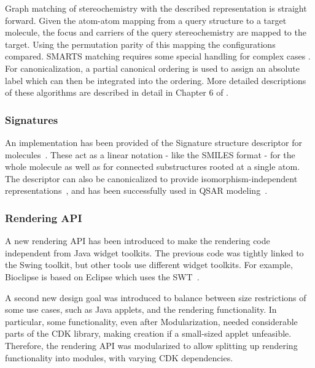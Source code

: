 \documentclass[10pt]{bmcart}
\begin{document}

  Graph matching of stereochemistry with the described representation is straight forward. Given
  the atom-atom mapping from a query structure to a target molecule, the focus and carriers of 
  the query stereochemistry are mapped to the target. Using the permutation parity of this mapping
  the configurations compared. SMARTS matching requires some special handling for complex cases 
  \cite{May2014_SMARTS}. For canonicalization, a partial canonical ordering is used to assign an 
  absolute label which can then be integrated into the ordering. More detailed descriptions of 
  these algorithms are described in detail in Chapter 6 of \cite{May2015}.

  \subsubsection*{Signatures}

  An implementation has been provided of the Signature structure descriptor for
  molecules~\cite{Faulon2003}. These act as a linear notation - like the SMILES format - 
  for the whole molecule as well as for connected substructures rooted at a single atom. The 
  descriptor can also be canonicalized to provide isomorphism-independent
  representations~\cite{Faulon2004}, and has been successfully used in QSAR modeling~\cite{signaturefingerprints,Spjuth2011DS,Moghadam2015,Alvarsson2014,Spjuth2012OS,Norinder2013}.

  \subsubsection*{Rendering API}

  A new rendering API has been introduced to make the rendering code independent
  from Java widget toolkits. The previous code was tightly linked to the Swing
  toolkit, but other tools use different widget toolkits. For example, Bioclipse
  is based on Eclipse which uses the SWT~\cite{spjuth2007bioclipse}. %
  
  A second new design goal was introduced to balance between size restrictions
  of some use cases, such as Java applets, and the rendering functionality. In
  particular, some functionality, even after Modularization, needed considerable
  parts of the CDK library, making creation if a small-sized applet unfeasible.
  Therefore, the rendering API was modularized to allow splitting up rendering
  functionality into modules, with varying CDK dependencies.
  
\end{document}
